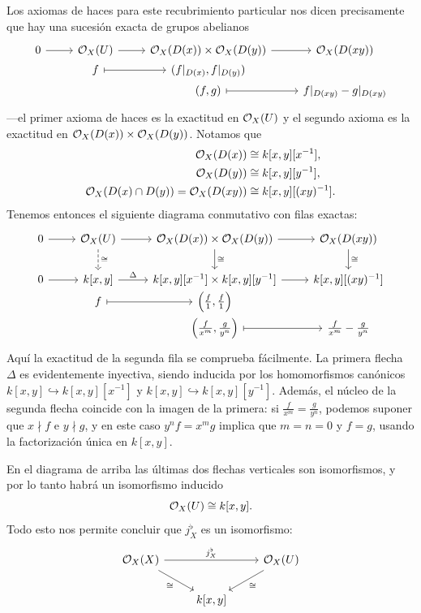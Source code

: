 \documentclass{article}
\numberwithin{equation}{section}
\theoremstyle{definition}
\begin{document}
\begin{ejemplo}
  Los axiomas de haces para este recubrimiento particular nos dicen precisamente
  que hay una sucesión exacta de grupos abelianos
  \[ \begin{tikzcd}[row sep=0pt]
      0\ar{r} & \O_X (U) \ar{r} & \O_X (D (x)) \times \O_X (D (y)) \ar{r} & \O_X (D (xy)) \\
      & f \ar[|->]{r} & (f|_{D (x)}, f|_{D (y)}) \\
      & & (f,g) \ar[|->]{r} & f|_{D (xy)} - g|_{D (xy)}
    \end{tikzcd} \]
  ---el primer axioma de haces es la exactitud en $\mathcal{O}_X (U)$ y el segundo axioma
  es la exactitud en ${\mathcal{O}_X (D (x)) \times \mathcal{O}_X (D (y))}$. Notamos que
  \begin{align*}
    \mathcal{O}_X (D (x)) & \cong k [x,y] [x^{-1}],\\
    \mathcal{O}_X (D (y)) & \cong k [x,y] [y^{-1}],\\
    \mathcal{O}_X (D (x) \cap D (y)) = \mathcal{O}_X (D (xy)) & \cong k [x,y] [(xy)^{-1}].
  \end{align*}
  Tenemos entonces el siguiente diagrama conmutativo con filas exactas:
  \[ \begin{tikzcd}
      0\ar{r} & \O_X (U) \ar{r}\ar[dashed]{d}{\isom} & \O_X (D (x)) \times \O_X (D (y)) \ar{r}\ar{d}{\isom} & \O_X (D (xy))\ar{d}{\isom} \\
      0\ar{r} & k [x,y] \ar{r}{\Delta} & k [x,y] [x^{-1}] \times k [x,y] [y^{-1}] \ar{r} & k [x,y] [(xy)^{-1}] \\[-2em]
      & f \ar[|->]{r} & \left(\frac{f}{1},\frac{f}{1}\right) \\[-2em]
      & & \Bigl(\frac{f}{x^m},\frac{g}{y^n}\Bigr) \ar[|->]{r} & \frac{f}{x^m} - \frac{g}{y^n}
    \end{tikzcd} \]
  Aquí la exactitud de la segunda fila se comprueba fácilmente. La primera
  flecha $\Delta$ es evidentemente inyectiva, siendo inducida por
  los homomorfismos canónicos $k [x,y] \hookrightarrow k [x,y] [x^{-1}]$ y
  $k [x,y] \hookrightarrow k [x,y] [y^{-1}]$. Además, el núcleo de la segunda
  flecha coincide con la imagen de la primera:
  si $\frac{f}{x^m} = \frac{g}{y^n}$, podemos suponer que $x \nmid f$ e
  $y \nmid g$, y en este caso $y^n f = x^m g$ implica que $m = n = 0$ y $f = g$,
  usando la factorización única en $k [x,y]$.

  En el diagrama de arriba las últimas dos flechas verticales son isomorfismos,
  y por lo tanto habrá un isomorfismo inducido
  $$\mathcal{O}_X (U) \cong k [x,y].$$
  Todo esto nos permite concluir que $j_X^\flat$ es un isomorfismo:
  \[ \begin{tikzcd}
      \O_X (X) \ar{rr}{j^\flat_X}\ar{dr}[swap]{\isom} && \O_X (U)\ar{dl}{\isom} \\
      & k [x,y]
    \end{tikzcd} \]


\end{ejemplo}
\end{document}
